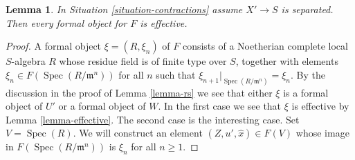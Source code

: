 \documentclass{stacks-project}
\theoremstyle{plain}
\newtheorem{lemma}[subsection]{Lemma}
\theoremstyle{definition}
\theoremstyle{remark}
\numberwithin{equation}{subsection}
\def\Spec{\mathop{\mathrm{Spec}}}
\begin{document}
\begin{lemma}
\label{lemma-formal-object-effective}
In Situation \ref{situation-contractions} assume $X' \to S$ is separated.
Then every formal object for $F$ is effective.
\end{lemma}

\begin{proof}
A formal object $\xi = (R, \xi_n)$ of $F$ consists of a Noetherian
complete local $S$-algebra $R$ whose residue field is of finite type
over $S$, together with elements $\xi_n \in F(\Spec(R/\mathfrak m^n))$
for all $n$ such that $\xi_{n + 1}|_{\Spec(R/\mathfrak m^n)} = \xi_n$.
By the discussion in the proof of Lemma \ref{lemma-rs}
we see that either $\xi$ is a formal object of $U'$ or a formal
object of $W$. In the first case we see that $\xi$ is effective
by Lemma \ref{lemma-effective}. The second case is the interesting case.
Set $V = \Spec(R)$. We will construct an element
$(Z, u', \hat x) \in F(V)$ whose image in $F(\Spec(R/\mathfrak m^n))$
is $\xi_n$ for all $n \geq 1$.


\end{proof}
\end{document}
